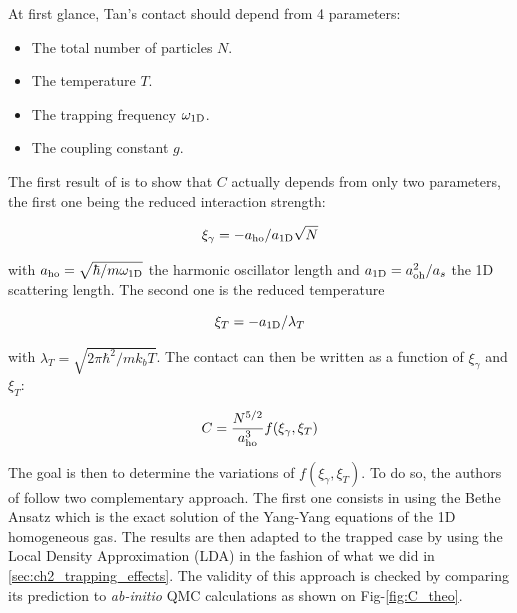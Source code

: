 At first glance, Tan's contact should depend from 4 parameters:

\begin{itemize}
    \item The total number of particles $N$.
    \item The temperature $T$.
    \item The trapping frequency $\omega_{\rm{1D}}$.
    \item The coupling constant $g$.
\end{itemize}

\noindent The first result of \cite{yao2018tan} is to show that $C$ actually depends from only two parameters, the first one being the reduced interaction strength:

\begin{equation}
    \xi_{\gamma}=-a_{\rm{ho}}/a_{\rm{1D}}\sqrt{N}
    \label{eq:xi_gamma}
\end{equation}

\noindent with $a_{\rm{ho}}=\sqrt{\hbar/m \omega_{\rm{1D}}}$ the harmonic oscillator length and $a_{\rm{1D}}=a_{\rm{oh}}^2/a_s$ the 1D scattering length. The second one is the reduced temperature

\begin{equation}
    \xi_T=-a_{\rm{1D}}/\lambda_T
\end{equation}

\noindent with $\lambda_T=\sqrt{2\pi \hbar^2/m k_b T}$. The contact can then be written as a function of $\xi_{\gamma}$ and $\xi_{T}$:

\begin{equation}
    C= \frac{N^{5/2}}{a_{\rm{ho}}^3} f(\xi_{\gamma},\xi_{T})
\end{equation}

The goal is then to determine the variations of $f(\xi_{\gamma},\xi_{T})$. To do so, the authors of \cite{yao2018tan} follow two complementary approach. The first one consists in using the Bethe Ansatz which is the exact solution of the Yang-Yang equations \cite{yang1969thermodynamics} of the 1D homogeneous gas. The results are then adapted to the trapped case by using the Local Density Approximation (LDA) in the fashion of what we did in \ref{sec:ch2_trapping_effects}. The validity of this approach is checked by comparing its prediction to {\it ab-initio} QMC calculations as shown on Fig-\ref{fig:C_theo}.

